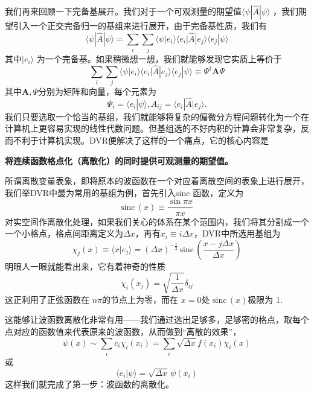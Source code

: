 \documentclass[12pt,a4paper,openany,twoside]{book}
\numberwithin{equation}{section}
\newcommand{\sinc}[1]{\mathrm{sinc} \, (#1)}
\begin{document}
      我们再来回顾一下完备基展开。我们对于一个可观测量的期望值$\langle \psi | \hat{A} | \psi \rangle $ ，我们期望引入一个正交完备归一的基组来进行展开，由于完备基性质，我们有
      \begin{equation}
      	\langle \psi | \hat{A} | \psi \rangle = \sum_i \sum_j \langle \psi | e_i \rangle \langle e_i | \hat{A} | e_j \rangle \langle e_j | \psi \rangle 
      \end{equation}
      其中$| e_i \rangle $ 为一个完备基。如果稍微想一想，我们就能够发现它实质上等价于
      \begin{equation}
      	\sum_i \sum_j \langle \psi | e_i \rangle \langle e_i | \hat{A} | e_j \rangle \langle e_j | \psi \rangle \equiv \Psi ^\dagger\mathbf{A} \Psi
      \end{equation}
      其中$\mathbf{A}, \Psi$分别为矩阵和向量，每个元素为
      \[
      	\Psi_i = \langle e_i | \psi \rangle , A_{ij} = \langle e_i | \hat{A} | e_j \rangle 
      .\] 
      我们只要选取一个恰当的基组，我们就能够将复杂的偏微分方程问题转化为一个在计算机上更容易实现的线性代数问题。但基组选的不好内积的计算会非常复杂，反而不利于计算机实现。DVR便解决了这样的一个痛点，它的核心内容是
      \begin{center}
      	\textbf{将连续函数格点化（离散化）的同时提供可观测量的期望值。}
      \end{center}
      所谓离散变量表象，即将原本的波函数在一个对应着离散空间的表象上进行展开，我们举DVR中最为常用的基组为例，首先引入sinc 函数，定义为
      \begin{equation}
      	\mathrm{sinc} \, (x) \equiv \frac{\sin{\pi x}}{\pi x}  
      \end{equation}
      对实空间作离散化处理，如果我们关心的体系在某个范围内，我们将其分割成一个一个小格点，格点间距离定义为$\Delta x$，再有$x_i \equiv i\Delta x$，DVR中所选用基组为
      \begin{equation}
      	\chi_j (x) \equiv \langle x | e_j \rangle = (\Delta x)^{-\frac{1}{2}}\, \sinc{\frac{x - j \Delta x}{\Delta x}} 
      \end{equation}
      明眼人一眼就能看出来，它有着神奇的性质
      \begin{equation}
      	\chi_i (x_j) = \sqrt{\frac{1}{\Delta x}} \delta_{ij}
      \end{equation}
      这正利用了正弦函数在 $n\pi$的节点上为零，而在 $x=0$处 $\sinc{x}$极限为 $1$.

      这能够让波函数离散化非常有用——我们通过选出足够多，足够密的格点，取每个点对应的函数值来代表原来的波函数，从而做到``离散的效果''，
      \begin{equation}
      	\psi(x) \sim \sum_i c_i \chi_i (x_i) = \sum_i \sqrt{\Delta x} f(x_i) \chi_i (x) 
      \end{equation}
      或
      \begin{equation}
      	\langle e_i | \psi \rangle = \sqrt{\Delta x} \,\psi(x_i) 
      \end{equation}
      这样我们就完成了第一步：波函数的离散化。
\end{document}

